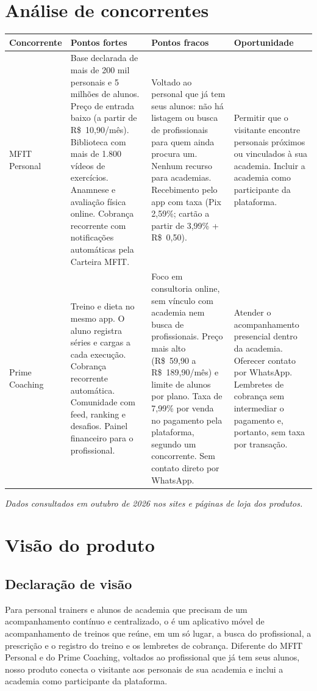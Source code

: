 \section{Análise de concorrentes}

{\small
\begin{tabularx}{\textwidth}{@{}l L L L@{}}
  \toprule
  \textbf{Concorrente} & \textbf{Pontos fortes} & \textbf{Pontos fracos} & \textbf{Oportunidade} \\
  \midrule
  MFIT Personal &
  Base declarada de mais de 200 mil personais e 5 milhões de alunos. Preço de entrada baixo (a partir de R\$~10,90/mês). Biblioteca com mais de 1.800 vídeos de exercícios. Anamnese e avaliação física online. Cobrança recorrente com notificações automáticas pela Carteira MFIT. &
  Voltado ao personal que já tem seus alunos: não há listagem ou busca de profissionais para quem ainda procura um. Nenhum recurso para academias. Recebimento pelo app com taxa (Pix 2,59\%; cartão a partir de 3,99\% + R\$~0,50). &
  Permitir que o visitante encontre personais próximos ou vinculados à sua academia. Incluir a academia como participante da plataforma. \\
  \addlinespace
  Prime Coaching &
  Treino e dieta no mesmo app. O aluno registra séries e cargas a cada execução. Cobrança recorrente automática. Comunidade com feed, ranking e desafios. Painel financeiro para o profissional. &
  Foco em consultoria online, sem vínculo com academia nem busca de profissionais. Preço mais alto (R\$~59,90 a R\$~189,90/mês) e limite de alunos por plano. Taxa de 7,99\% por venda no pagamento pela plataforma, segundo um concorrente. Sem contato direto por WhatsApp. &
  Atender o acompanhamento presencial dentro da academia. Oferecer contato por WhatsApp. Lembretes de cobrança sem intermediar o pagamento e, portanto, sem taxa por transação. \\
  \bottomrule
\end{tabularx}
}

\textit{Dados consultados em outubro de 2026 nos sites e páginas de loja dos produtos.}

\section{Visão do produto}

\subsection{Declaração de visão}
Para personal trainers e alunos de academia que precisam de um acompanhamento contínuo e centralizado, o \nomeapp{} é um aplicativo móvel de acompanhamento de treinos que reúne, em um só lugar, a busca do profissional, a prescrição e o registro do treino e os lembretes de cobrança. Diferente do MFIT Personal e do Prime Coaching, voltados ao profissional que já tem seus alunos, nosso produto conecta o visitante aos personais de sua academia e inclui a academia como participante da plataforma.


